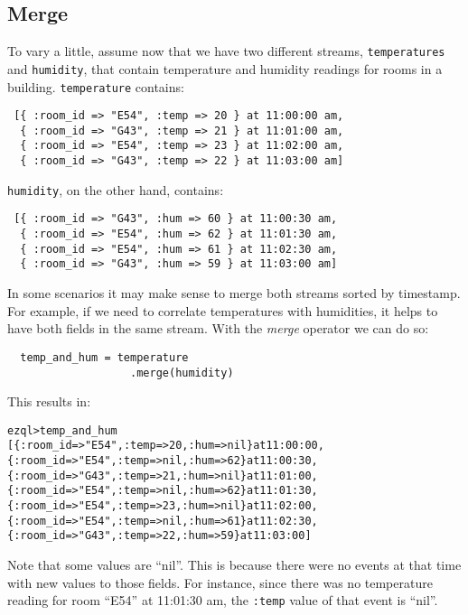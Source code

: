 \documentclass{report}
\newenvironment{evaluation}
{
  \framed
  \begin{alltt}
}
{
  \end{alltt}
  \endframed
}
\begin{document}
\subsection{Merge}
\label{sec:merge}

To vary a little, assume now that we have two different streams,
\verb=temperatures= and \verb=humidity=, that contain temperature and
humidity readings for rooms in a building. \verb=temperature= contains:

\begin{verbatim}
 [{ :room_id => "E54", :temp => 20 } at 11:00:00 am,
  { :room_id => "G43", :temp => 21 } at 11:01:00 am,
  { :room_id => "E54", :temp => 23 } at 11:02:00 am,
  { :room_id => "G43", :temp => 22 } at 11:03:00 am]
\end{verbatim}

\verb=humidity=, on the other hand, contains:

\begin{verbatim}
 [{ :room_id => "G43", :hum => 60 } at 11:00:30 am,
  { :room_id => "E54", :hum => 62 } at 11:01:30 am,
  { :room_id => "E54", :hum => 61 } at 11:02:30 am,
  { :room_id => "G43", :hum => 59 } at 11:03:00 am]
\end{verbatim}

In some scenarios it may make sense to merge both streams sorted by
timestamp. For example, if we need to correlate temperatures with
humidities, it helps to have both fields in the same stream. With the
\emph{merge} operator we can do so:

\begin{verbatim}
  temp_and_hum = temperature
                   .merge(humidity)
\end{verbatim}

This results in:

\begin{evaluation}
ezql> temp_and_hum
[\{ :room_id => "E54", :temp =>  20, :hum => nil \} at 11:00:00,
 \{ :room_id => "E54", :temp => nil, :hum =>  62 \} at 11:00:30,
 \{ :room_id => "G43", :temp =>  21, :hum => nil \} at 11:01:00,
 \{ :room_id => "E54", :temp => nil, :hum =>  62 \} at 11:01:30,
 \{ :room_id => "E54", :temp =>  23, :hum => nil \} at 11:02:00,
 \{ :room_id => "E54", :temp => nil, :hum =>  61 \} at 11:02:30,
 \{ :room_id => "G43", :temp =>  22, :hum =>  59 \} at 11:03:00]
\end{evaluation}

Note that some values are ``nil''. This is because there were no
events at that time with new values to those fields. For instance,
since there was no temperature reading for room ``E54'' at 11:01:30
am, the \verb=:temp= value of that event is ``nil''.
\end{document}
